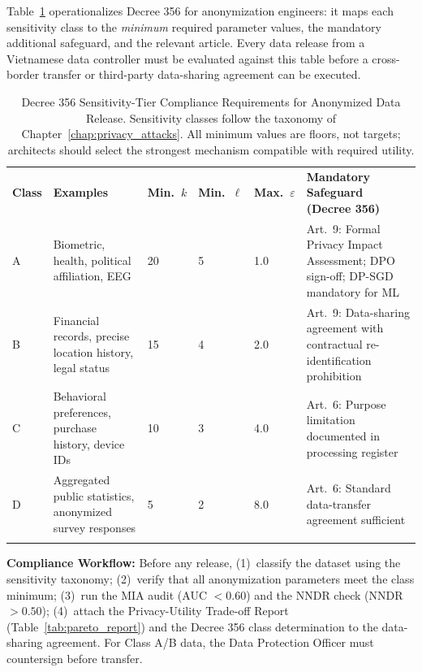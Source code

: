 Table~\ref{tab:decree356_compliance} operationalizes Decree 356 for anonymization engineers: it maps each sensitivity class to the \emph{minimum} required parameter values, the mandatory additional safeguard, and the relevant article. Every data release from a Vietnamese data controller must be evaluated against this table before a cross-border transfer or third-party data-sharing agreement can be executed.

\begin{table}[ht]
\centering
\caption{Decree 356 Sensitivity-Tier Compliance Requirements for Anonymized Data Release. Sensitivity classes follow the taxonomy of Chapter~\ref{chap:privacy_attacks}. All minimum values are floors, not targets; architects should select the strongest mechanism compatible with required utility.}
\label{tab:decree356_compliance}
\renewcommand{\arraystretch}{1.3}
\begin{tabular}{p{1.5cm} p{2.5cm} p{1.4cm} p{1.4cm} p{1.4cm} p{3.8cm}}
\hline\noalign{\smallskip}
\textbf{Class} & \textbf{Examples} & \textbf{Min.\ $k$} & \textbf{Min.\ $\ell$} & \textbf{Max.\ $\varepsilon$} & \textbf{Mandatory Safeguard (Decree 356)} \\
\noalign{\smallskip}\svhline\noalign{\smallskip}
\cellcolor{costhigh}A & Biometric, health, political affiliation, EEG & \cellcolor{costhigh}20 & \cellcolor{costhigh}5 & \cellcolor{costhigh}1.0 & Art.~9: Formal Privacy Impact Assessment; DPO sign-off; DP-SGD mandatory for ML \\[4pt]
\cellcolor{costhigh}B & Financial records, precise location history, legal status & \cellcolor{costhigh}15 & \cellcolor{costhigh}4 & \cellcolor{costhigh}2.0 & Art.~9: Data-sharing agreement with contractual re-identification prohibition \\[4pt]
\cellcolor{costmed}C & Behavioral preferences, purchase history, device IDs & \cellcolor{costmed}10 & \cellcolor{costmed}3 & \cellcolor{costmed}4.0 & Art.~6: Purpose limitation documented in processing register \\[4pt]
\cellcolor{costlow}D & Aggregated public statistics, anonymized survey responses & \cellcolor{costlow}5 & \cellcolor{costlow}2 & \cellcolor{costlow}8.0 & Art.~6: Standard data-transfer agreement sufficient \\
\noalign{\smallskip}\hline\noalign{\smallskip}
\end{tabular}
\end{table}

\begin{svgraybox}
\textbf{Compliance Workflow:} Before any release, (1)~classify the dataset using the sensitivity taxonomy; (2)~verify that all anonymization parameters meet the class minimum; (3)~run the MIA audit (AUC $< 0.60$) and the NNDR check (NNDR $> 0.50$); (4)~attach the Privacy-Utility Trade-off Report (Table~\ref{tab:pareto_report}) and the Decree 356 class determination to the data-sharing agreement. For Class A/B data, the Data Protection Officer must countersign before transfer.
\end{svgraybox}

